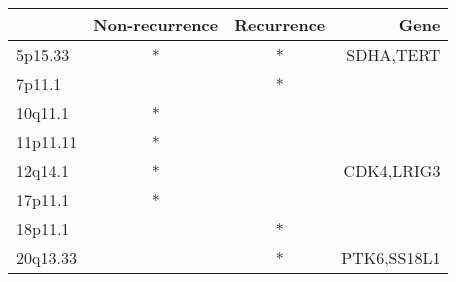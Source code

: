 \begin{tabular}{lccr}
\toprule
{} & Non-recurrence & Recurrence &         Gene \\
\midrule
5p15.33  &              * &          * &    SDHA,TERT \\
7p11.1   &                &          * &              \\
10q11.1  &              * &            &              \\
11p11.11 &              * &            &              \\
12q14.1  &              * &            &   CDK4,LRIG3 \\
17p11.1  &              * &            &              \\
18p11.1  &                &          * &              \\
20q13.33 &                &          * &  PTK6,SS18L1 \\
\bottomrule
\end{tabular}
